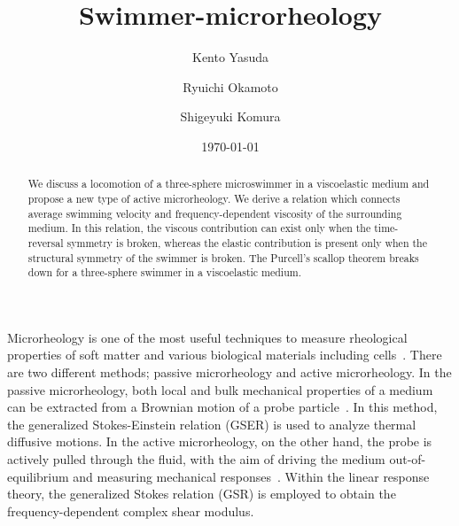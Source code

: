\documentclass[nofootinbib,twocolumn,showpacs,preprintnumbers,pre,aps]{revtex4-1}
\begin{document}
\title{Swimmer-microrheology}%

\author{Kento Yasuda}

\author{Ryuichi Okamoto}

\author{Shigeyuki Komura}


\date{\today}


\begin{abstract}
We discuss a locomotion of a three-sphere microswimmer in a viscoelastic medium
and propose a new type of active microrheology.
We derive a relation which connects average swimming velocity and frequency-dependent 
viscosity of the surrounding medium.
In this relation, the viscous contribution can exist only when the time-reversal symmetry is broken, 
whereas the elastic contribution is present only when the structural symmetry of the swimmer is broken. 
The Purcell's scallop theorem breaks down for a three-sphere swimmer in a 
viscoelastic medium.
\end{abstract}

\maketitle


Microrheology is one of the most useful techniques to measure rheological properties 
of soft matter and various biological materials including cells~\cite{SM10,Chen10}.
There are two different methods;  passive microrheology and active microrheology.
In the passive microrheology, both local and bulk mechanical properties of a medium 
can be extracted from a Brownian motion of a probe particle~\cite{MW95,Mason00}.
In this method, the generalized Stokes-Einstein relation (GSER) is used to analyze 
thermal diffusive motions.
In the active microrheology, on the other hand, the probe is actively pulled through the
fluid, with the aim of driving the medium out-of-equilibrium and measuring mechanical 
responses~\cite{GSOMS,Schnurr97}. 
Within the linear response theory, the generalized Stokes relation (GSR) is employed to 
obtain the frequency-dependent complex shear modulus. 
\end{document}
